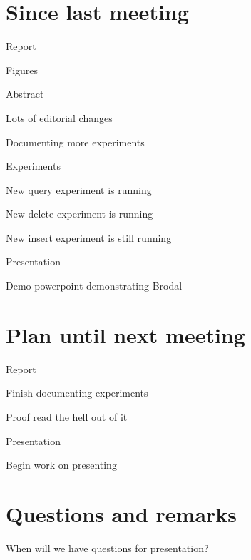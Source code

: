 \documentclass[a4paper,11pt,agenda,chair]{meetingmins}
\begin{document}
\maketitle

\section{Since last meeting}
\begin{items}
\item Report
	\begin{items}
		\item Figures
		\item Abstract
		\item Lots of editorial changes
		\item Documenting more experiments
	\end{items}
\item Experiments
	\begin{items}
		\item New query experiment is running
		\item New delete experiment is running
		\item New insert experiment is still running
	\end{items}
\item Presentation
	\begin{items}
		\item Demo powerpoint demonstrating Brodal
	\end{items}
\end{items}

\section{Plan until next meeting}
\begin{items}
\item Report
	\begin{items}
		\item Finish documenting experiments
		\item Proof read the hell out of it
	\end{items}
\item Presentation
	\begin{items}
		\item Begin work on presenting
	\end{items}
\end{items}

\section{Questions and remarks}
\begin{items}
	\item When will we have questions for presentation?
\end{items}
\end{document}
